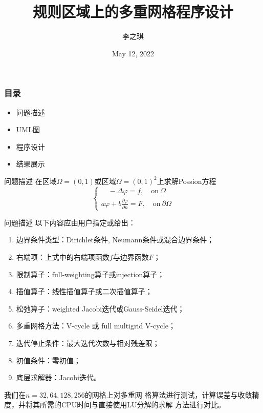 \documentclass{beamer}
\title{规则区域上的多重网格程序设计}
\author[李之琪]{李之琪}
\date[May 12, 2022]{May 12, 2022}
\begin{document}
\frame{\titlepage}
\begin{frame}\frametitle{目录}
	\begin{itemize}
		\item 问题描述
		\item UML图
		\item 程序设计
                \item 结果展示
	\end{itemize}
\end{frame}
\begin{frame}{问题描述}
 在区域$\Omega = (0,1)$或区域$\Omega =(0,1)^2$上求解Possion方程
\begin{equation}
  \label{eq:oriequ}
\left\{\begin{matrix}
\quad -\Delta \varphi = f, \quad \text{on}\ \Omega\\
a\varphi+b\frac{\partial \varphi}{\partial n}  = F, \quad \text{on}\ \partial \Omega
\end{matrix}\right.
\end{equation}


\end{frame}

\begin{frame}{问题描述}
  以下内容应由用户指定或给出：
 \begin{enumerate}[(1)]
 \item 边界条件类型：Dirichlet条件, Neumann条件或混合边界条件；
 \item 右端项：上式中的右端项函数$f$与边界函数$F$；
 \item 限制算子：full-weighting算子或injection算子；
 \item 插值算子：线性插值算子或二次插值算子；
 \item 松弛算子：weighted Jacobi迭代或Gauss-Seidel迭代；
 \item 多重网格方法：V-cycle 或 full multigrid V-cycle；
 \item 迭代停止条件：最大迭代次数与相对残差限；
 \item 初值条件：零初值；
 \item 底层求解器：Jacobi迭代。
 \end{enumerate}
 我们在$n=32,64,128,256$的网格上对多重网
 格算法进行测试，计算误差与收敛精度，并将其所需的CPU时间与直接使用LU分解的求解
 方法进行对比。
\end{frame}
\end{document}
